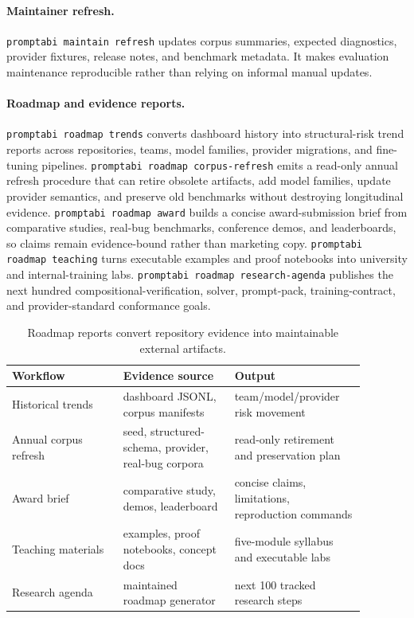 \documentclass[10pt]{article}
\begin{document}
\paragraph{Maintainer refresh.}
\texttt{promptabi maintain refresh} updates corpus summaries, expected
diagnostics, provider fixtures, release notes, and benchmark metadata. It makes
evaluation maintenance reproducible rather than relying on informal manual
updates.

\paragraph{Roadmap and evidence reports.}
\texttt{promptabi roadmap trends} converts dashboard history into structural-risk
trend reports across repositories, teams, model families, provider migrations,
and fine-tuning pipelines. \texttt{promptabi roadmap corpus-refresh} emits a
read-only annual refresh procedure that can retire obsolete artifacts, add model
families, update provider semantics, and preserve old benchmarks without
destroying longitudinal evidence. \texttt{promptabi roadmap award} builds a
concise award-submission brief from comparative studies, real-bug benchmarks,
conference demos, and leaderboards, so claims remain evidence-bound rather than
marketing copy. \texttt{promptabi roadmap teaching} turns executable examples and
proof notebooks into university and internal-training labs. \texttt{promptabi
roadmap research-agenda} publishes the next hundred compositional-verification,
solver, prompt-pack, training-contract, and provider-standard conformance goals.

\begin{table}[h]
\centering
\small
\begin{tabular}{p{0.28\linewidth}p{0.28\linewidth}p{0.32\linewidth}}
\toprule
Workflow & Evidence source & Output \\
\midrule
Historical trends & dashboard JSONL, corpus manifests & team/model/provider risk
movement \\
Annual corpus refresh & seed, structured-schema, provider, real-bug corpora &
read-only retirement and preservation plan \\
Award brief & comparative study, demos, leaderboard & concise claims,
limitations, reproduction commands \\
Teaching materials & examples, proof notebooks, concept docs & five-module
syllabus and executable labs \\
Research agenda & maintained roadmap generator & next 100 tracked research
steps \\
\bottomrule
\end{tabular}
\caption{Roadmap reports convert repository evidence into maintainable external
artifacts.}
\label{tab:roadmap-reports}
\end{table}
\end{document}
